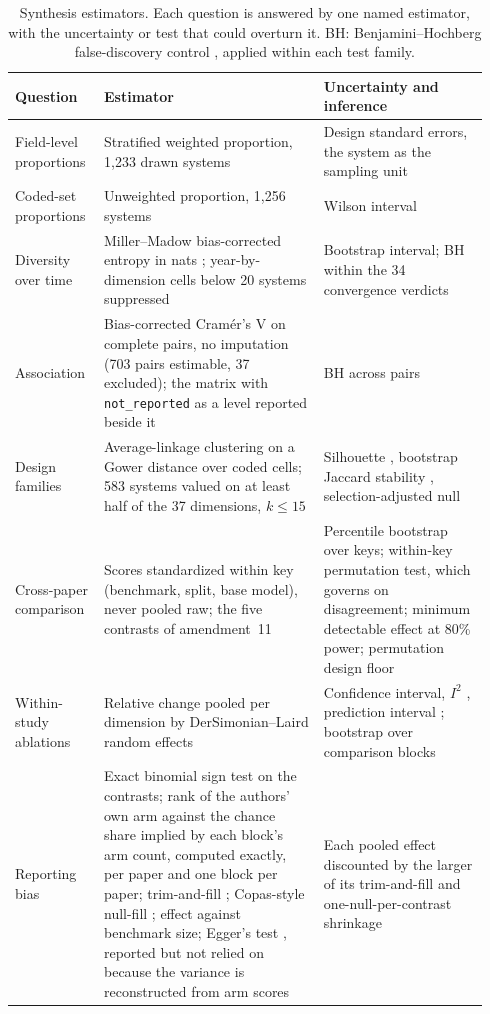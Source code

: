 \begin{table}[htbp]
  \footnotesize
  \caption{Synthesis estimators. Each question is answered by one named estimator, with the uncertainty or
  test that could overturn it. BH: Benjamini--Hochberg false-discovery control \citep{benjamini1995fdr},
  applied within each test family.}
  \label{tab:estimators}
  \begin{tabular}{@{}p{0.17\linewidth} p{0.44\linewidth} p{0.33\linewidth}@{}}
    \toprule
    Question & Estimator & Uncertainty and inference \\
    \midrule
    Field-level proportions & Stratified weighted proportion, 1,233 drawn systems & Design standard errors, the system as the sampling unit \\
    Coded-set proportions & Unweighted proportion, 1,256 systems & Wilson interval
      \citep{wilson1927interval} \\
    Diversity over time & Miller--Madow bias-corrected entropy in nats \citep{paninski2003entropy};
      year-by-dimension cells below 20 systems suppressed & Bootstrap interval; BH within the 34
      convergence verdicts \\
    Association & Bias-corrected Cram\'er's V \citep{cramer1946methods,bergsma2013cramersv} on complete
      pairs, no imputation (703 pairs estimable, 37 excluded); the matrix with \texttt{not\_reported} as a
      level reported beside it & BH across pairs \\
    Design families & Average-linkage clustering on a Gower distance \citep{gower1971similarity} over coded
      cells; 583 systems valued on at least half of the 37 dimensions, $k \leq 15$ & Silhouette
      \citep{rousseeuw1987silhouette}, bootstrap Jaccard stability \citep{hennig2007stability},
      selection-adjusted null \\
    Cross-paper comparison & Scores standardized within key (benchmark, split, base model), never pooled
      raw; the five contrasts of amendment~11 & Percentile bootstrap over keys; within-key permutation test,
      which governs on disagreement; minimum detectable effect at 80\% power; permutation design floor \\
    Within-study ablations & Relative change pooled per dimension by DerSimonian--Laird random effects
      \citep{dersimonian1986meta} & Confidence interval, $I^2$ \citep{higgins2002heterogeneity},
      prediction interval \citep{higgins2009predictioninterval}; bootstrap over comparison blocks \\
    Reporting bias & Exact binomial sign test on the contrasts; rank of the authors' own arm against the
      chance share implied by each block's arm count, computed exactly, per paper and one block per paper;
      trim-and-fill \citep{duval2000trimfill}; Copas-style null-fill \citep{copas2000funnel}; effect against
      benchmark size; Egger's test \citep{egger1997bias}, reported but not relied on because the variance
      is reconstructed from arm scores & Each pooled effect discounted by the larger of its trim-and-fill
      and one-null-per-contrast shrinkage \\
    \bottomrule
  \end{tabular}
\end{table}

